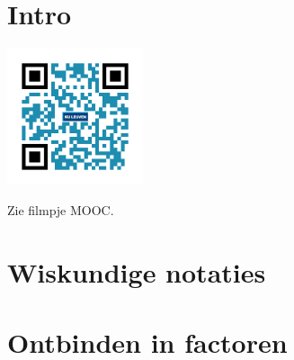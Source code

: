 
\section*{Intro}
\begin{minipage}{.25\linewidth}
	\raggedright
	\includegraphics[width=4cm]{1_elem_rekenvaardigheden_A/inputs/QR_Code_INTRO_module_1}
\end{minipage}
\begin{minipage}{.7\linewidth}
Zie filmpje MOOC.
\end{minipage}


\section{Wiskundige notaties}




\section{Ontbinden in factoren}
\label{sec:ontbindeninfactoren}
